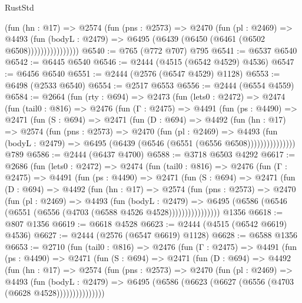 \begin{lexlean}{RustStd}
\begin{coremodule}
                    (fun (hn : @17) =>
                    @2574
                      (fun (pns : @2573) =>
                      @2470
                        (fun (pl : @2469) =>
                        @4493
                          (fun (bodyL : @2479) =>
                          @6495 (@6439 (@6450 (@6461 (@6502 @6508))))))))))))))))
@6540 := @765 (@772 @707) @795
@6541 := @6537 @6540
@6542 := @6445 @6540
@6546 := @2444 (@4515 (@6542 @4529) @4536)
@6547 := @6456 @6540
@6551 := @2444 (@2576 (@6547 @4529) @1128)
@6553 := @6498 (@2533 @6540)
@6554 := @2517 @6553
@6556 := @2444 (@6554 @4559)
@6584 := @2664
    (fun (rty : @694) =>
    @2473
      (fun (lets0 : @2472) =>
      @2474
        (fun (tail0 : @816) =>
        @2476
          (fun (Γ : @2475) =>
          @4491
            (fun (ps : @4490) =>
            @2471
              (fun (S : @694) =>
              @2471
                (fun (D : @694) =>
                @4492
                  (fun (hn : @17) =>
                  @2574
                    (fun (pns : @2573) =>
                    @2470
                      (fun (pl : @2469) =>
                      @4493
                        (fun (bodyL : @2479) =>
                        @6495 (@6439 (@6546 (@6551 (@6556 @6508)))))))))))))))
    @789
@6586 := @2444 (@6437 @4700)
@6588 := @3718 @6503 @4292
@6617 := @2686
    (fun (lets0 : @2472) =>
    @2474
      (fun (tail0 : @816) =>
      @2476
        (fun (Γ : @2475) =>
        @4491
          (fun (ps : @4490) =>
          @2471
            (fun (S : @694) =>
            @2471
              (fun (D : @694) =>
              @4492
                (fun (hn : @17) =>
                @2574
                  (fun (pns : @2573) =>
                  @2470
                    (fun (pl : @2469) =>
                    @4493
                      (fun (bodyL : @2479) =>
                      @6495 (@6586 (@6546 (@6551 (@6556 (@4703 (@6588 @4526 @4528))))))))))))))))
    @1356
@6618 := @807 @1356
@6619 := @6618 @4528
@6623 := @2444 (@4515 (@6542 @6619) @4536)
@6627 := @2444 (@2576 (@6547 @6619) @1128)
@6628 := @6588 @1356
@6653 := @2710
    (fun (tail0 : @816) =>
    @2476
      (fun (Γ : @2475) =>
      @4491
        (fun (ps : @4490) =>
        @2471
          (fun (S : @694) =>
          @2471
            (fun (D : @694) =>
            @4492
              (fun (hn : @17) =>
              @2574
                (fun (pns : @2573) =>
                @2470
                  (fun (pl : @2469) =>
                  @4493
                    (fun (bodyL : @2479) =>
                    @6495 (@6586 (@6623 (@6627 (@6556 (@4703 (@6628 @4528)))))))))))))))

\end{coremodule}
\end{lexlean}
